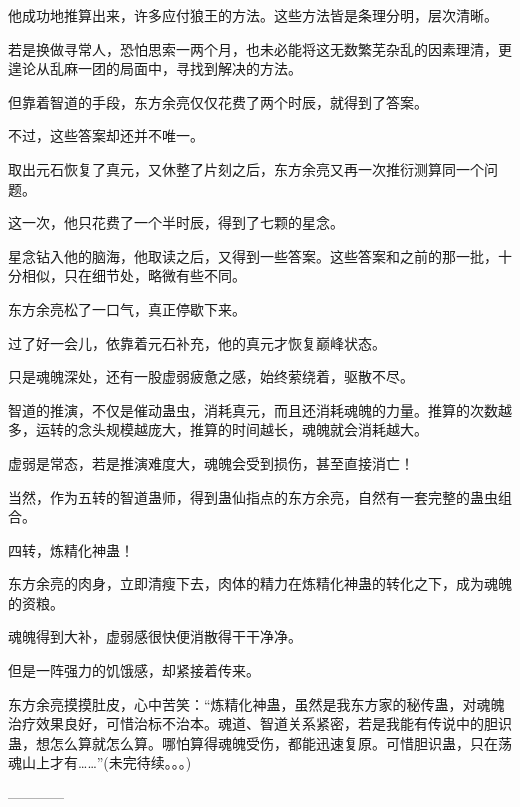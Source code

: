 \begin{this_body}
他成功地推算出来，许多应付狼王的方法。这些方法皆是条理分明，层次清晰。

若是换做寻常人，恐怕思索一两个月，也未必能将这无数繁芜杂乱的因素理清，更遑论从乱麻一团的局面中，寻找到解决的方法。

但靠着智道的手段，东方余亮仅仅花费了两个时辰，就得到了答案。

不过，这些答案却还并不唯一。

取出元石恢复了真元，又休整了片刻之后，东方余亮又再一次推衍测算同一个问题。

这一次，他只花费了一个半时辰，得到了七颗的星念。

星念钻入他的脑海，他取读之后，又得到一些答案。这些答案和之前的那一批，十分相似，只在细节处，略微有些不同。

东方余亮松了一口气，真正停歇下来。

过了好一会儿，依靠着元石补充，他的真元才恢复巅峰状态。

只是魂魄深处，还有一股虚弱疲惫之感，始终萦绕着，驱散不尽。

智道的推演，不仅是催动蛊虫，消耗真元，而且还消耗魂魄的力量。推算的次数越多，运转的念头规模越庞大，推算的时间越长，魂魄就会消耗越大。

虚弱是常态，若是推演难度大，魂魄会受到损伤，甚至直接消亡！

当然，作为五转的智道蛊师，得到蛊仙指点的东方余亮，自然有一套完整的蛊虫组合。

四转，炼精化神蛊！

东方余亮的肉身，立即清瘦下去，肉体的精力在炼精化神蛊的转化之下，成为魂魄的资粮。

魂魄得到大补，虚弱感很快便消散得干干净净。

但是一阵强力的饥饿感，却紧接着传来。

东方余亮摸摸肚皮，心中苦笑：“炼精化神蛊，虽然是我东方家的秘传蛊，对魂魄治疗效果良好，可惜治标不治本。魂道、智道关系紧密，若是我能有传说中的胆识蛊，想怎么算就怎么算。哪怕算得魂魄受伤，都能迅速复原。可惜胆识蛊，只在荡魂山上才有……”(未完待续。。。)

------------

\end{this_body}

